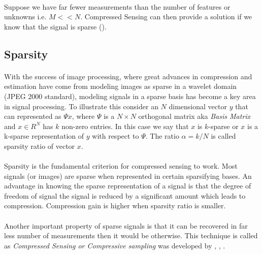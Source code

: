 \paragraph{}Suppose we have far fewer measurements than the number of  
features or unknowns i.e. $M<<N$. Compressed Sensing can then provide a solution if we know that the signal is sparse (\cite{david06}). 

\subsection{Sparsity}
\label{s:sparsity}

\paragraph{}With the success of image processing, where great advances in compression and estimation have come
from modeling images as sparse in a wavelet domain (JPEG 2000 standard), modeling signals in a sparse
basis has become a key area in signal processing. To illustrate this consider an $N$ dimensional vector
$y$ that can represented as $\Psi x$, where $\Psi$ is a $N \times N$ orthogonal matrix aka \emph{Basis Matrix} 
and $x \in R^N$ has $k$ non-zero entries. In this case we say that $x$ is $k$-sparse or $x$ is a k-sparse representation
of $y$ with respect to $\Psi$. The ratio $\alpha = k/N$ is called sparsity ratio of vector $x$.

\paragraph{}Sparsity is the fundamental criterion for compressed sensing to work. Most signals (or images) are 
sparse when represented in certain sparsifying bases. An advantage in knowing the sparse representation
of a signal is that the degree of freedom of signal the signal is reduced by a significant amount which leads to compression.
Compression gain is higher when sparsity ratio is smaller.

\paragraph{}Another important property of sparse signals is that it can be recovered in far less number of
measurements then it would be otherwise. This technique is called as \emph{Compressed Sensing or Compressive
sampling} was developed by \cite{Can106}, \cite{Can206}, \cite{david06} .

